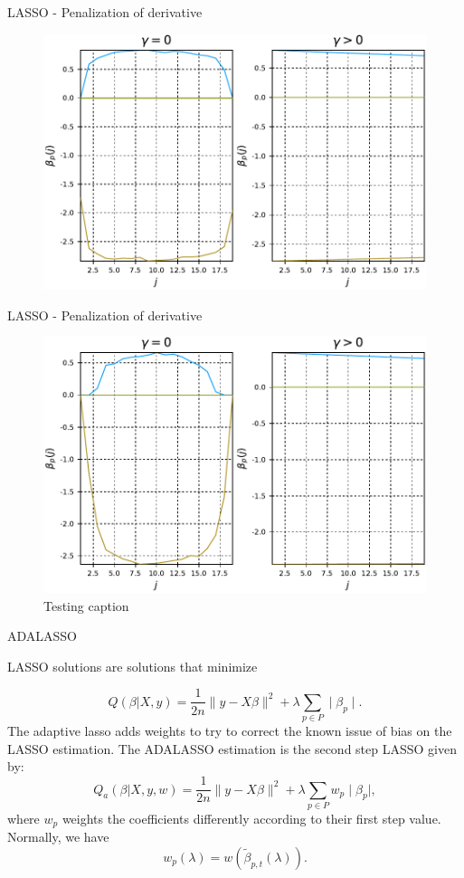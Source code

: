\documentclass[11pt]{beamer}
\begin{document}
\begin{frame}{LASSO - Penalization of derivative}

\begin{figure}
\centering
\includegraphics[width=0.9\linewidth]{Images/Lambda500-gamma30.pdf}
\end{figure}

\end{frame}

\begin{frame}{LASSO - Penalization of derivative}

\begin{figure}
\centering
\includegraphics[width=0.7\linewidth]{Images/Lambda1000-gamma100.pdf}
\caption{Testing caption}
\end{figure}

\end{frame}


\begin{frame}{ADALASSO}

\small
LASSO solutions are solutions that minimize

\[
Q(\beta|X,y)=\frac{1}{2n}\parallel y-X\beta\parallel^{2}+\lambda\sum_{p \in P}\mid\beta_{p}\mid.
\]
The adaptive lasso adds weights to try to correct the known issue of bias on the LASSO estimation. The ADALASSO estimation is the second step LASSO given by:
\[
Q_{a}(\beta|X,y,w)=\frac{1}{2n}\parallel y-X\beta\parallel^{2}+\lambda\sum_{p \in P}w_{p}\mid\beta_{p}\mid,
\]
where $w_p$ weights the coefficients differently according to their first step value.  Normally, we have
\[
w_{p}(\lambda)=w(\tilde{\beta}_{p,t}(\lambda)).
\]

\end{frame}
\end{document}
